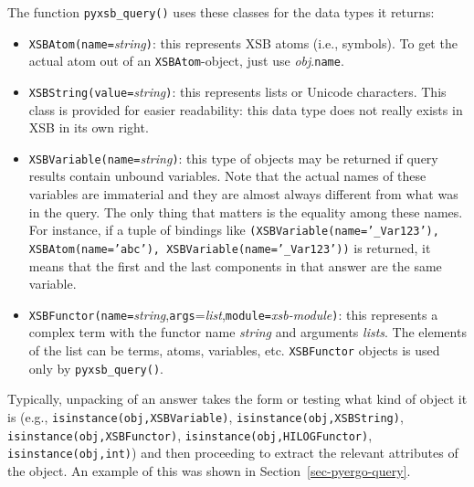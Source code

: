 The function \texttt{pyxsb\_query()} uses these classes for the data types
it returns: 
\begin{itemize}
\item  \texttt{XSBAtom(name=}\emph{string}\texttt{)}: this represents XSB
  atoms (i.e., \ERGO symbols). To get the actual atom out of an
  \texttt{XSBAtom}-object, just use \emph{obj}.\texttt{name}.      
\item  \texttt{XSBString(value=}\emph{string}\texttt{)}: this represents
  lists or Unicode characters. This class is provided for easier
  readability: this data type does not really exists in XSB in its own
  right.
\item  \texttt{XSBVariable(name=}\emph{string}\texttt{)}: this type of
  objects may be returned if query results contain unbound variables.
  Note that the actual names of these variables are immaterial and they are
  almost always different from what was in the query. The only thing that
  matters is the equality among these names. For instance, if a tuple of
  bindings like \texttt{(XSBVariable(name='\_Var123'), XSBAtom(name='abc'),
  XSBVariable(name='\_Var123'))} is returned, it means that the first and the
last components in that answer are the same variable.
\item
  \texttt{XSBFunctor(name=}\emph{string},\texttt{args}=\emph{list},\texttt{module=}\emph{xsb-module}\texttt{)}:
  this represents a complex term with the functor name \emph{string} and
  arguments \emph{lists}. The elements of the list can be terms, atoms,
  variables, etc.  
  \texttt{XSBFunctor}  objects is used only by \texttt{pyxsb\_query()}.
\end{itemize}

Typically, unpacking of an answer takes the form or testing what kind of
object it is (e.g., \texttt{isinstance(obj,XSBVariable)},
\texttt{isinstance(obj,XSBString)}, \texttt{isinstance(obj,XSBFunctor)},
\texttt{isinstance(obj,HILOGFunctor)},
\texttt{isinstance(obj,int)})
and then proceeding to extract the relevant attributes of the object. An
example of this was shown in Section~\ref{sec-pyergo-query}.





